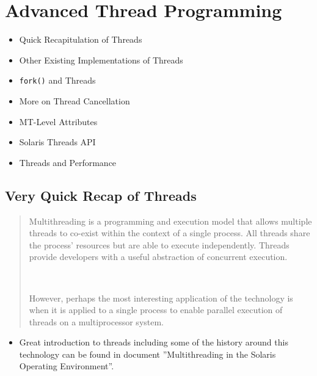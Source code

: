 
\section{Advanced Thread Programming}

\begin{itemize}
\item Quick Recapitulation of Threads
\item Other Existing Implementations of Threads
\item \texttt{fork()} and Threads
\item More on Thread Cancellation
\item MT-Level Attributes
\item Solaris Threads API
\item Threads and Performance
\end{itemize}



\subsection{Very Quick Recap of Threads}


\begin{quote}
Multithreading is a programming and execution model that allows multiple threads
to co-exist within the context of a single process. All threads share the
process' resources but are able to execute independently. Threads provide
developers with a useful abstraction of concurrent execution.

~

However, perhaps the most interesting application of the technology is when it
is applied to a single process to enable parallel execution of threads on a
multiprocessor system.
\end{quote}


\begin{itemize}
\item Great introduction to threads including some of the history around
this technology can be found in document ''Multithreading in the Solaris
Operating Environment''.
\end{itemize}

